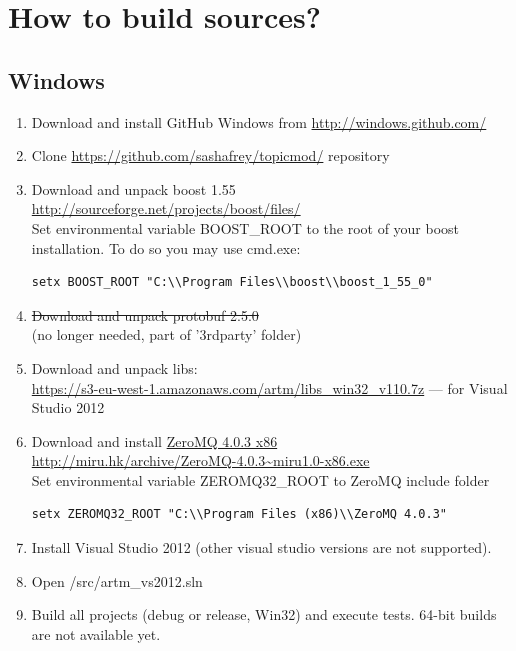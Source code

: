 \documentclass[11pt,a4paper,twoside]{report}
\begin{document}
\section{How to build sources?}
\label{label:how_to_build}

\subsection{Windows}

\begin{enumerate}
   \item Download and install GitHub Windows from \url{http://windows.github.com/}
   \item Clone \url{https://github.com/sashafrey/topicmod/} repository
   \item Download and unpack boost 1.55  \\
         \url{http://sourceforge.net/projects/boost/files/} \\
         Set environmental variable BOOST\_ROOT to the root of your boost installation.
         To do so you may use cmd.exe:
\begin{verbatim}
setx BOOST_ROOT "C:\\Program Files\\boost\\boost_1_55_0"
\end{verbatim}
   \item \st{Download and unpack protobuf 2.5.0} \\ (no longer needed, part of '3rdparty' folder)
   \item Download and unpack libs: \\
    \url{https://s3-eu-west-1.amazonaws.com/artm/libs_win32_v110.7z} --- for Visual Studio 2012
   \item Download and install \href{http://zeromq.org/distro:microsoft-windows}{ZeroMQ 4.0.3 x86} \\
         \url{http://miru.hk/archive/ZeroMQ-4.0.3~miru1.0-x86.exe} \\
         Set environmental variable ZEROMQ32\_ROOT to ZeroMQ include folder
\begin{verbatim}
setx ZEROMQ32_ROOT "C:\\Program Files (x86)\\ZeroMQ 4.0.3"
\end{verbatim}
    \item Install Visual Studio 2012 (other visual studio versions are not supported). \\
    \item Open /src/artm\_vs2012.sln
    \item Build all projects (debug or release, Win32) and execute tests. 64-bit builds are not available yet.
\end{enumerate}
\end{document}
